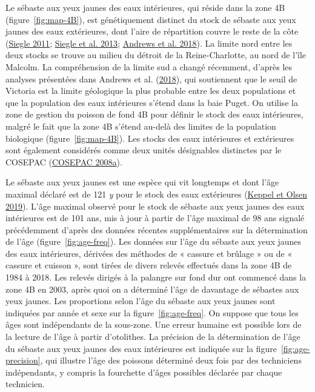 \documentclass[french,11pt]{book}
\begin{document}
\label{app:biological-data}

Le sébaste aux yeux jaunes des eaux intérieures, qui réside dans la zone 4B (figure~\ref{fig:map-4B}), est génétiquement distinct du stock de sébaste aux yeux jaunes des eaux extérieures, dont l'aire de répartition couvre le reste de la côte (\protect\hyperlink{ref-siegle2011}{Siegle 2011}; \protect\hyperlink{ref-siegle2013}{Siegle et al. 2013}; \protect\hyperlink{ref-andrews2018}{Andrews et al. 2018}). La limite nord entre les deux stocks se trouve au milieu du détroit de la Reine-Charlotte, au nord de l'île Malcolm. La compréhension de la limite sud a changé récemment, d'après les analyses présentées dans Andrews et al. (\protect\hyperlink{ref-andrews2018}{2018}), qui soutiennent que le seuil de Victoria est la limite géologique la plus probable entre les deux populations et que la population des eaux intérieures s'étend dans la baie Puget. On utilise la zone de gestion du poisson de fond 4B pour définir le stock des eaux intérieures, malgré le fait que la zone 4B s'étend au-delà des limites de la population biologique (figure~\ref{fig:map-4B}). Les stocks des eaux intérieures et extérieures sont également considérés comme deux unités désignables distinctes par le COSEPAC (\protect\hyperlink{ref-cosewic2008}{COSEPAC 2008a}).

\hypertarget{sec:growth}{%
\label{sec:growth}}

Le sébaste aux yeux jaunes est une espèce qui vit longtemps et dont l'âge maximal déclaré est de 121 \emph{y} pour le stock des eaux extérieures (\protect\hyperlink{ref-keppel2019}{Keppel et Olsen 2019}). L'âge maximal observé pour le stock de sébaste aux yeux jaunes des eaux intérieures est de 101 ans, mis à jour à partir de l'âge maximal de 98 ans signalé précédemment d'après des données récentes supplémentaires sur la détermination de l'âge (figure~\ref{fig:age-freq}). Les données sur l'âge du sébaste aux yeux jaunes des eaux intérieures, dérivées des méthodes de « cassure et brûlage » ou de « cassure et cuisson », sont tirées de divers relevés effectués dans la zone 4B de 1984 à 2018. Les relevés dirigés à la palangre sur fond dur ont commencé dans la zone 4B en 2003, après quoi on a déterminé l'âge de davantage de sébastes aux yeux jaunes. Les proportions selon l'âge du sébaste aux yeux jaunes sont indiquées par année et sexe sur la figure~\ref{fig:age-freq}. On suppose que tous les âges sont indépendants de la sous-zone. Une erreur humaine est possible lors de la lecture de l'âge à partir d'otolithes. La précision de la détermination de l'âge du sébaste aux yeux jaunes des eaux intérieures est indiquée sur la figure~\ref{fig:age-precision}, qui illustre l'âge des poissons déterminé deux fois par des techniciens indépendants, y compris la fourchette d'âges possibles déclarée par chaque technicien.
\end{document}
